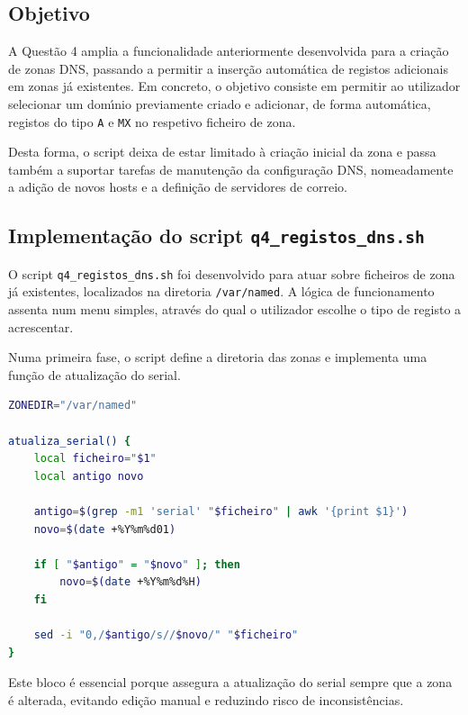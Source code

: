 \subsection{Objetivo}

A Quest\~ao 4 amplia a funcionalidade anteriormente desenvolvida para a cria\c{c}\~ao de zonas DNS, passando a permitir a inser\c{c}\~ao autom\'atica de registos adicionais em zonas j\'a existentes. Em concreto, o objetivo consiste em permitir ao utilizador selecionar um dom\'{\i}nio previamente criado e adicionar, de forma autom\'atica, registos do tipo \texttt{A} e \texttt{MX} no respetivo ficheiro de zona.

Desta forma, o script deixa de estar limitado \`a cria\c{c}\~ao inicial da zona e passa tamb\'em a suportar tarefas de manuten\c{c}\~ao da configura\c{c}\~ao DNS, nomeadamente a adi\c{c}\~ao de novos hosts e a defini\c{c}\~ao de servidores de correio.

\subsection{Implementa\c{c}\~ao do script \texttt{q4\_registos\_dns.sh}}

O script \texttt{q4\_registos\_dns.sh} foi desenvolvido para atuar sobre ficheiros de zona j\'a existentes, localizados na diretoria \texttt{/var/named}. A l\'ogica de funcionamento assenta num menu simples, atrav\'es do qual o utilizador escolhe o tipo de registo a acrescentar.

Numa primeira fase, o script define a diretoria das zonas e implementa uma fun\c{c}\~ao de atualiza\c{c}\~ao do serial.

\begin{lstlisting}[language=bash,caption={Estrutura base e atualizacao do serial}]
ZONEDIR="/var/named"

atualiza_serial() {
    local ficheiro="$1"
    local antigo novo

    antigo=$(grep -m1 'serial' "$ficheiro" | awk '{print $1}')
    novo=$(date +%Y%m%d01)

    if [ "$antigo" = "$novo" ]; then
        novo=$(date +%Y%m%d%H)
    fi

    sed -i "0,/$antigo/s//$novo/" "$ficheiro"
}
\end{lstlisting}

Este bloco \'e essencial porque assegura a atualiza\c{c}\~ao do serial sempre que a zona \'{e} alterada, evitando edi\c{c}\~ao manual e reduzindo risco de inconsist\^encias.

